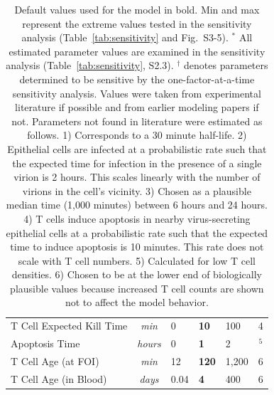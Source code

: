 \documentclass[preprint,10pt,authoryear]{elsarticle}
\begin{document}
\begin{table}[!ht]
\begin{center}
\begin{tabular}{| l | c | l l l | c |}
  T Cell Expected Kill Time & \textit{min} & 0 & \textbf{10} & 100 & 4 \\
  Apoptosis Time & \textit{hours} & 0 & \textbf{1} & 2 & \citep{Ganusov2008}$^5$ \\
  T Cell Age (at FOI) & \textit{min} & 12 & \textbf{120} & 1,200 & 6 \\
  T Cell Age (in Blood) & \textit{days} & 0.04 & \textbf{4} & 400 & 6 \\
  \hline  
\end{tabular}
\caption{Default values used for the model in bold.  Min and max represent the extreme values tested in the sensitivity analysis (Table~\ref{tab:sensitivity} and Fig.~S3-5).  $^*$ All estimated parameter values are examined in the sensitivity analysis (Table~\ref{tab:sensitivity}, S2.3).  $^{\dagger}$ denotes parameters determined to be sensitive by the one-factor-at-a-time sensitivity analysis.  Values were taken from experimental literature if possible and from earlier modeling papers if not.  Parameters not found in literature were estimated as follows.  1) Corresponds to a 30 minute half-life.  2) Epithelial cells are infected at a probabilistic rate such that the expected time for infection in the presence of a single virion is 2 hours.  This scales linearly with the number of virions in the cell's vicinity.  3) Chosen as a plausible median time (1,000 minutes) between 6 hours and 24 hours.  4) T cells induce apoptosis in nearby virus-secreting epithelial cells at a probabilistic rate such that the expected time to induce apoptosis is 10 minutes.  This rate does not scale with T cell numbers.  5) Calculated for low T cell densities.  6) Chosen to be at the lower end of biologically plausible values because increased T cell counts are shown not to affect the model behavior. }
\label{tab:parameters}
\end{center}
\end{table}
\end{document}
